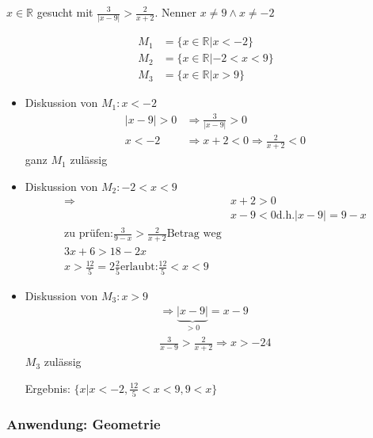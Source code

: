 \begin{example}[test]
$x\in \mathbb{R}$ gesucht mit $\frac{3}{|x-9|} > \frac{2}{x+2}$. Nenner $x\neq9 \land x\neq -2$


\begin{align*}
M_1 &= \{x \in \mathbb{R} | x < -2\} \\
M_2 &= \{x \in \mathbb{R} | -2 < x < 9\} \\
M_3 &= \{x \in \mathbb{R} | x > 9\}
\end{align*}

\begin{itemize}
 \item Diskussion von $M_1: x < -2$
\begin{align*}
|x-9|>0 &\Rightarrow \frac{3}{|x-9|} > 0 \\
x<-2 &\Rightarrow x+2<0 \Rightarrow \frac{2}{x+2}<0
\end{align*}
ganz $M_1$ zulässig
 \item Diskussion von $M_2: -2<x<9$
\begin{align*}
\Rightarrow &x+2 > 0 \\
&x-9<0 \textrm{d.h.} |x-9|=9-x \\
\textrm{zu prüfen:}
\frac{3}{9-x} > \frac{2}{x+2} \textrm{Betrag weg} \\
3x+6 > 18-2x \\
x > \frac{12}{5} = 2 \frac{2}{5}
\textrm{erlaubt:} \frac{12}{5}<x<9
\end{align*}
 \item Diskussion von $M_3: x>9$
\begin{align*}
 \Rightarrow \underbrace{|x-9|}_{>0} = x-9 \\
\frac{3}{x-9} > \frac{2}{x+2}
\Rightarrow x>-24
\end{align*}
$M_3$ zulässig

Ergebnis: $\{x|x<-2, \frac{12}{5}<x<9, 9<x\}$
\end{itemize}

\end{example}

\subsubsection*{Anwendung: Geometrie}

